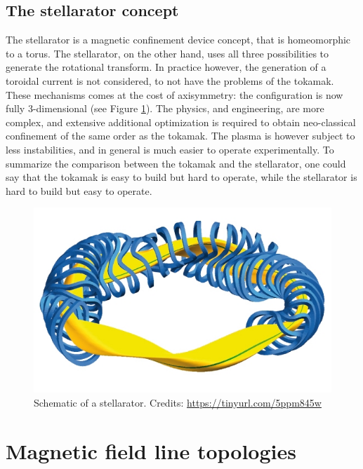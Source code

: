 \documentclass[my_thesis.tex]{subfiles}
\begin{document}
\subsection{The stellarator concept} \label{sec.stellarator concept}
The stellarator is a magnetic confinement device concept, that is homeomorphic to a torus. The stellarator, on the other hand, uses all three possibilities to generate the rotational transform. In practice however, the generation of a toroidal current is not considered, to not have the problems of the tokamak. These mechanisms comes at the cost of axisymmetry: the configuration is now fully 3-dimensional (see Figure \ref{fig stellarator sketch}). The physics, and engineering, are more complex, and extensive additional optimization is required to obtain neo-classical confinement of the same order as the tokamak. The plasma is however subject to less instabilities, and in general is much easier to operate experimentally. To summarize the comparison between the tokamak and the stellarator, one could say that the tokamak is easy to build but hard to operate, while the stellarator is hard to build but easy to operate.

\begin{figure}
    \centering
    \includegraphics[width=\linewidth]{images/Introduction/StellaratorSketch.jpg}
    \caption{Schematic of a stellarator. Credits: \url{https://tinyurl.com/5ppm845w}}
    \label{fig stellarator sketch}
\end{figure}




\section{Magnetic field line topologies}
\end{document}
